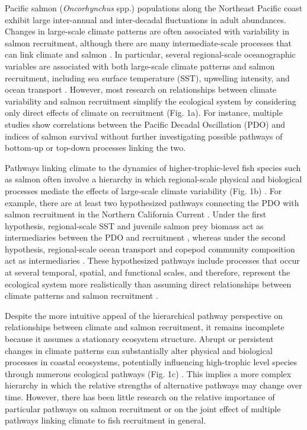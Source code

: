 Pacific salmon (\emph{Oncorhynchus} spp.) populations along the Northeast
Pacific coast exhibit large inter-annual and inter-decadal fluctuations in adult
abundances. Changes in large-scale climate patterns are often associated with
variability in salmon recruitment, although there are many intermediate-scale
processes that can link climate and salmon \citep{Mueter2002a, Beamish2004b,
Drinkwater2010a, Malick2015a}. In particular, several regional-scale
oceanographic variables are associated with both large-scale climate patterns
and salmon recruitment, including sea surface temperature (SST), upwelling
intensity, and ocean transport \citep{King2011, Chavez2003a, Keister2011a}.
However, most research on relationships between climate variability and salmon
recruitment simplify the ecological system by considering only direct effects of
climate on recruitment (Fig. 1a). For instance, multiple studies show
correlations between the Pacific Decadal Oscillation (PDO) and indices of salmon
survival \citep{Mantua1997a, Burke2013, Malick2009a} without further
investigating possible pathways of bottom-up or top-down processes linking the
two.

Pathways linking climate to the dynamics of higher-trophic-level fish species
such as salmon often involve a hierarchy in which regional-scale physical and
biological processes mediate the effects of large-scale climate variability
(Fig. 1b) \citep{Drinkwater2010a, Ottersen2010a, Dippner2006}. For example,
there are at least two hypothesized pathways connecting the PDO with salmon
recruitment in the Northern California Current \citep{Wells2008a, Keister2011a}.
Under the first hypothesis, regional-scale SST and juvenile salmon prey biomass
act as intermediaries between the PDO and recruitment \citep{Daly2013,
Cole2000a}, whereas under the second hypothesis, regional-scale ocean transport
and copepod community composition act as intermediaries \citep{Bi2011a,
Keister2011a}. These hypothesized pathways include processes that occur at
several temporal, spatial, and functional scales, and therefore, represent the
ecological system more realistically than assuming direct relationships between
climate patterns and salmon recruitment \citep{Levin1992a, Ottersen2010a,
Bakun1996a, Hunt2002a}.

Despite the more intuitive appeal of the hierarchical pathway perspective on
relationships between climate and salmon recruitment, it remains incomplete
because it assumes a stationary ecosystem structure.  Abrupt or persistent
changes in climate patterns can substantially alter physical and biological
processes in coastal ecosystems, potentially influencing high-trophic level
species through numerous ecological pathways (Fig. 1c) \citep{Anderson1999a,
Mantua1997a}. This implies a more complex hierarchy in which the relative
strengths of alternative pathways may change over time. However, there has been
little research on the relative importance of particular pathways on salmon
recruitment or on the joint effect of multiple pathways linking climate to fish
recruitment in general.

